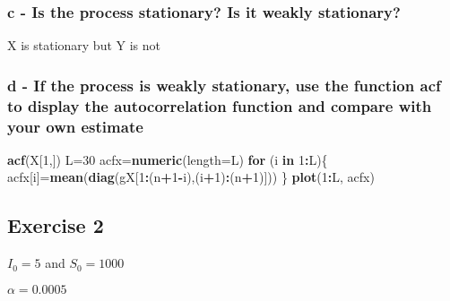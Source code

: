 \documentclass[]{article}
\newenvironment{Shaded}{\begin{snugshade}}{\end{snugshade}}
\newcommand{\ControlFlowTok}[1]{\textcolor[rgb]{0.13,0.29,0.53}{\textbf{#1}}}
\newcommand{\DataTypeTok}[1]{\textcolor[rgb]{0.13,0.29,0.53}{#1}}
\newcommand{\DecValTok}[1]{\textcolor[rgb]{0.00,0.00,0.81}{#1}}
\newcommand{\KeywordTok}[1]{\textcolor[rgb]{0.13,0.29,0.53}{\textbf{#1}}}
\newcommand{\NormalTok}[1]{#1}
\newcommand{\OperatorTok}[1]{\textcolor[rgb]{0.81,0.36,0.00}{\textbf{#1}}}
\begin{document}
\hypertarget{c---is-the-process-stationary-is-it-weakly-stationary}{%
\subsubsection{c - Is the process stationary? Is it weakly
stationary?}\label{c---is-the-process-stationary-is-it-weakly-stationary}}

X is stationary but Y is not

\hypertarget{d---if-the-process-is-weakly-stationary-use-the-function-acf-to-display-the-autocorrelation-function-and-compare-with-your-own-estimate}{%
\subsubsection{d - If the process is weakly stationary, use the function
acf to display the autocorrelation function and compare with your own
estimate}\label{d---if-the-process-is-weakly-stationary-use-the-function-acf-to-display-the-autocorrelation-function-and-compare-with-your-own-estimate}}

\begin{Shaded}
\begin{Highlighting}[]
\KeywordTok{acf}\NormalTok{(X[}\DecValTok{1}\NormalTok{,])}
\NormalTok{L=}\DecValTok{30}
\NormalTok{acfx=}\KeywordTok{numeric}\NormalTok{(}\DataTypeTok{length=}\NormalTok{L)}
\ControlFlowTok{for}\NormalTok{ (i }\ControlFlowTok{in} \DecValTok{1}\OperatorTok{:}\NormalTok{L)\{}
\NormalTok{  acfx[i]=}\KeywordTok{mean}\NormalTok{(}\KeywordTok{diag}\NormalTok{(gX[}\DecValTok{1}\OperatorTok{:}\NormalTok{(n}\OperatorTok{+}\DecValTok{1}\OperatorTok{-}\NormalTok{i),(i}\OperatorTok{+}\DecValTok{1}\NormalTok{)}\OperatorTok{:}\NormalTok{(n}\OperatorTok{+}\DecValTok{1}\NormalTok{)]))}
\NormalTok{\}}
\KeywordTok{plot}\NormalTok{(}\DecValTok{1}\OperatorTok{:}\NormalTok{L, acfx)}
\end{Highlighting}
\end{Shaded}

\hypertarget{exercise-2}{%
\subsection{Exercise 2}\label{exercise-2}}

\(I_{0} = 5\) and \(S_{0} = 1000\)

\(\alpha = 0.0005\)
\end{document}
